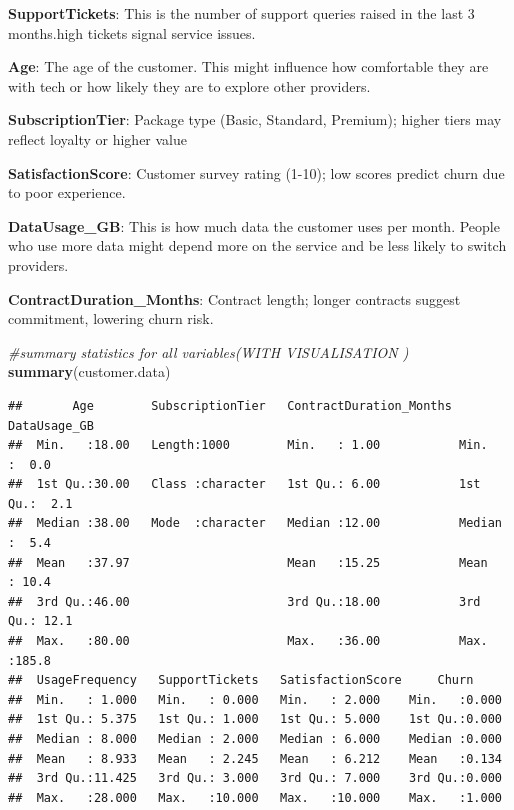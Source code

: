 \documentclass[
]{article}
\newenvironment{Shaded}{\begin{snugshade}}{\end{snugshade}}
\newcommand{\CommentTok}[1]{\textcolor[rgb]{0.56,0.35,0.01}{\textit{#1}}}
\newcommand{\FunctionTok}[1]{\textcolor[rgb]{0.13,0.29,0.53}{\textbf{#1}}}
\newcommand{\NormalTok}[1]{#1}
\begin{document}
\textbf{SupportTickets}: This is the number of support queries raised in
the last 3 months.high tickets signal service issues.

\textbf{Age}: The age of the customer. This might influence how
comfortable they are with tech or how likely they are to explore other
providers.

\textbf{SubscriptionTier}: Package type (Basic, Standard, Premium);
higher tiers may reflect loyalty or higher value

\textbf{SatisfactionScore}: Customer survey rating (1-10); low scores
predict churn due to poor experience.

\textbf{DataUsage\_GB}: This is how much data the customer uses per
month. People who use more data might depend more on the service and be
less likely to switch providers.

\textbf{ContractDuration\_Months}: Contract length; longer contracts
suggest commitment, lowering churn risk.\\

\begin{Shaded}
\begin{Highlighting}[]
\CommentTok{\#summary statistics for all variables(WITH VISUALISATION )}
\FunctionTok{summary}\NormalTok{(customer.data)}
\end{Highlighting}
\end{Shaded}

\begin{verbatim}
##       Age        SubscriptionTier   ContractDuration_Months  DataUsage_GB  
##  Min.   :18.00   Length:1000        Min.   : 1.00           Min.   :  0.0  
##  1st Qu.:30.00   Class :character   1st Qu.: 6.00           1st Qu.:  2.1  
##  Median :38.00   Mode  :character   Median :12.00           Median :  5.4  
##  Mean   :37.97                      Mean   :15.25           Mean   : 10.4  
##  3rd Qu.:46.00                      3rd Qu.:18.00           3rd Qu.: 12.1  
##  Max.   :80.00                      Max.   :36.00           Max.   :185.8  
##  UsageFrequency   SupportTickets   SatisfactionScore     Churn      
##  Min.   : 1.000   Min.   : 0.000   Min.   : 2.000    Min.   :0.000  
##  1st Qu.: 5.375   1st Qu.: 1.000   1st Qu.: 5.000    1st Qu.:0.000  
##  Median : 8.000   Median : 2.000   Median : 6.000    Median :0.000  
##  Mean   : 8.933   Mean   : 2.245   Mean   : 6.212    Mean   :0.134  
##  3rd Qu.:11.425   3rd Qu.: 3.000   3rd Qu.: 7.000    3rd Qu.:0.000  
##  Max.   :28.000   Max.   :10.000   Max.   :10.000    Max.   :1.000
\end{verbatim}
\end{document}
